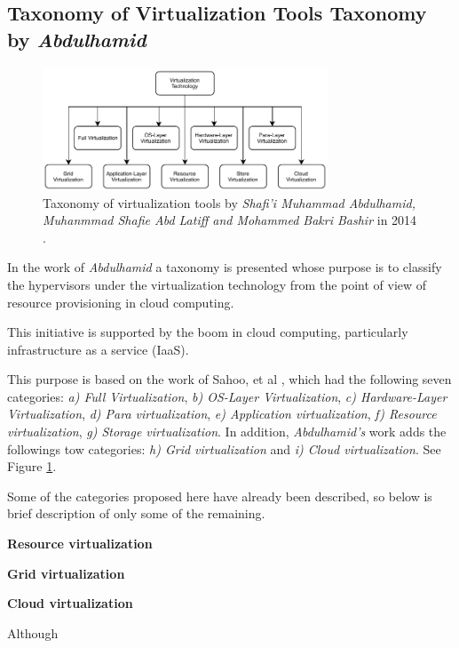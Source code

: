 	\subsection{Taxonomy of Virtualization Tools Taxonomy by \textit{Abdulhamid}}
	
	\begin{figure}[H]
		\centering
		\includegraphics[width=8.5cm]{images/Abdulhamid2014.pdf}
		\vspace{-0.2cm}
		\caption{Taxonomy of virtualization tools by \textit{Shafi'i Muhammad Abdulhamid, Muhanmmad Shafie Abd Latiff and Mohammed Bakri Bashir} in 2014 \cite{Abdulhamid2014}.}
		\label{fig:TaxonomyByAbdulhamid}
	\end{figure}
	
	In the work of \textit{Abdulhamid} \cite{Abdulhamid2014} a taxonomy is presented whose purpose is to classify the hypervisors under the virtualization technology from the point of view of resource provisioning in cloud computing. 
	
	This initiative is supported by the boom in cloud computing, particularly infrastructure as a service (IaaS). 
	
	This purpose is based on the work of Sahoo, et al \cite{Sahoo2010}, which had the following seven categories: \textit{a) Full Virtualization}, \textit{b) OS-Layer Virtualization}, \textit{c) Hardware-Layer Virtualization}, \textit{d) Para virtualization}, \textit{e) Application virtualization}, \textit{f) Resource virtualization}, \textit{g) Storage virtualization}. In addition, \textit{Abdulhamid's} work adds the followings tow categories: \textit{h) Grid virtualization} and \textit{i) Cloud virtualization}. See Figure \ref{fig:TaxonomyByAbdulhamid}.
	
	Some of the categories proposed here have already been described, so below is brief description of only some of the remaining. 
	
	\textbf{Resource virtualization}
	
	\textbf{Grid virtualization}
	
	\textbf{Cloud virtualization}
	
	Although
	
	
